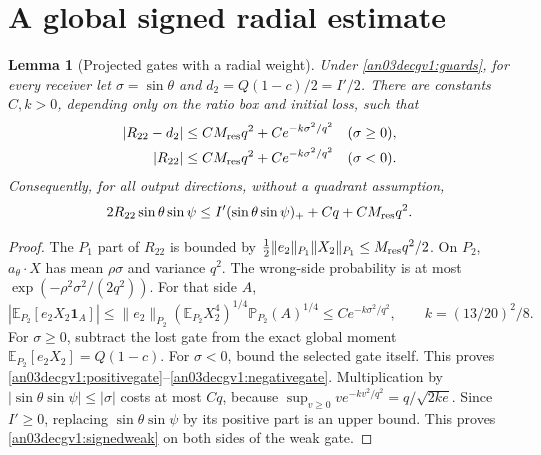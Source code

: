 \documentclass[11pt]{article}
\newtheorem{lemma}[proposition]{Lemma}
\theoremstyle{remark}\newtheorem{remark}[proposition]{Remark}
\newcommand{\E}{\mathbb E}
\newcommand{\one}{\mathbf1}
\begin{document}
\section{A global signed radial estimate}
\begin{lemma}[Projected gates with a radial weight]
\label{an03decgv1:projected}
Under \eqref{an03decgv1:guards}, for every receiver let
$\sigma=\sin\theta$ and $d_2=Q(1-c)/2=I'/2$.
There are constants $C,k>0$, depending only on the ratio box
and initial loss, such that
\begin{align}
 |R_{22}-d_2|&\le CM_{\rm res}q^2+Ce^{-k\sigma^2/q^2}
       &&(\sigma\ge0),\label{an03decgv1:positivegate}\\
 |R_{22}|&\le CM_{\rm res}q^2+Ce^{-k\sigma^2/q^2}
       &&(\sigma<0).\label{an03decgv1:negativegate}
\end{align}
Consequently, for all output directions, without a quadrant
assumption,
\begin{equation}
 2R_{22}\sin\theta\sin\psi
 \le I'(\sin\theta\sin\psi)_++Cq+CM_{\rm res}q^2.
 \label{an03decgv1:signedweak}
\end{equation}
\end{lemma}
\begin{proof}
The $P_1$ part of $R_{22}$ is bounded by
$\frac12\|e_2\|_{P_1}\|X_2\|_{P_1}\le M_{\rm res}q^2/2$.
On $P_2$, $a_\theta\cdot X$ has mean $\rho\sigma$ and
variance $q^2$. The wrong-side probability is at most
$\exp(-\rho^2\sigma^2/(2q^2))$. For that side $A$,
\[
 |\E_{P_2}[e_2X_2\one_A]|
 \le\|e_2\|_{P_2}(\E_{P_2}X_2^4)^{1/4}
                         \mathbb P_{P_2}(A)^{1/4}
 \le C e^{-k\sigma^2/q^2},\qquad k=(13/20)^2/8.
\]
For $\sigma\ge0$, subtract the lost gate from the exact
global moment $\E_{P_2}[e_2X_2]=Q(1-c)$.
For $\sigma<0$, bound the selected gate itself. This proves
\eqref{an03decgv1:positivegate}--\eqref{an03decgv1:negativegate}.
Multiplication by $|\sin\theta\sin\psi|\le|\sigma|$ costs
at most $Cq$, because
$\sup_{v\ge0}v e^{-kv^2/q^2}=q/\sqrt{2ke}$.
Since $I'\ge0$, replacing $\sin\theta\sin\psi$ by its
positive part is an upper bound. This proves
\eqref{an03decgv1:signedweak} on both sides of the weak gate.
\end{proof}
\end{document}
